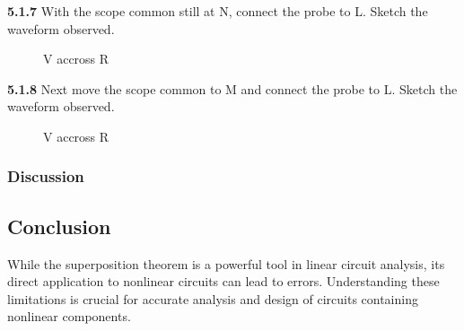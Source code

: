 \textbf{5.1.7} With the scope common still at N, connect the probe to L. Sketch the waveform observed. \\
\begin{figure}[H]
    \centering
    \caption{V accross R}
    \label{fig:ac_signal-non_R}
\end{figure}
\textbf{5.1.8} Next move the scope common to M and connect the probe to L. Sketch the waveform observed. \\
\begin{figure}[H]
    \centering
    \caption{V accross R}
    \label{fig:ac_signal-non_R}
\end{figure}
\subsubsection*{Discussion}


\subsection*{Conclusion}

While the superposition theorem is a powerful tool in linear circuit analysis, its direct application to nonlinear circuits can lead to errors. Understanding these limitations is crucial for accurate analysis and design of circuits containing nonlinear components.
